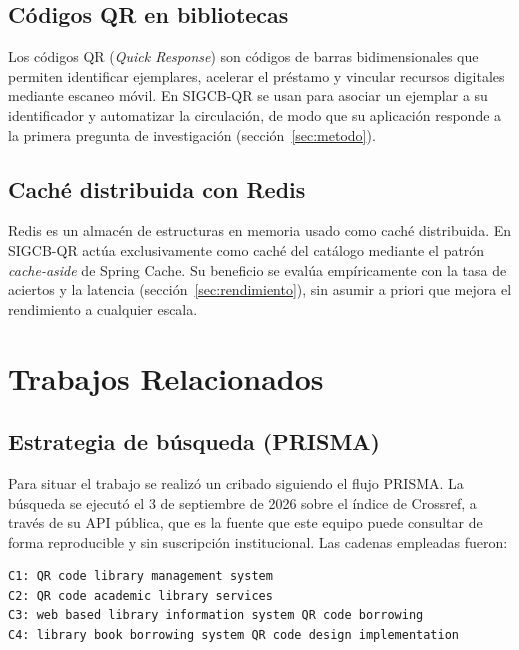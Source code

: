 \documentclass[11pt,a4paper]{article}
\begin{document}
\subsection{Códigos QR en bibliotecas}

Los códigos QR (\emph{Quick Response}) son códigos de barras bidimensionales que
permiten identificar ejemplares, acelerar el préstamo y vincular recursos
digitales mediante escaneo móvil. En SIGCB-QR se usan para asociar un ejemplar a
su identificador y automatizar la circulación, de modo que su aplicación responde
a la primera pregunta de investigación (sección~\ref{sec:metodo}).

\subsection{Caché distribuida con Redis}

Redis es un almacén de estructuras en memoria usado como caché distribuida. En
SIGCB-QR actúa exclusivamente como caché del catálogo mediante el patrón
\emph{cache-aside} de Spring Cache. Su beneficio se evalúa empíricamente con la
tasa de aciertos y la latencia (sección~\ref{sec:rendimiento}), sin asumir a
priori que mejora el rendimiento a cualquier escala.

\section{Trabajos Relacionados}\label{sec:relacionados}

\subsection{Estrategia de búsqueda (PRISMA)}

Para situar el trabajo se realizó un cribado siguiendo el flujo PRISMA. La
búsqueda se ejecutó el 3 de septiembre de 2026 sobre el índice de Crossref, a
través de su API pública, que es la fuente que este equipo puede consultar de
forma reproducible y sin suscripción institucional. Las cadenas empleadas
fueron:

\begin{lstlisting}
C1: QR code library management system
C2: QR code academic library services
C3: web based library information system QR code borrowing
C4: library book borrowing system QR code design implementation
\end{lstlisting}
\end{document}

